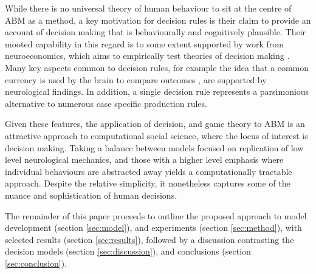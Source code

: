 While there is no universal theory of human behaviour to sit at the centre of \ac{ABM} as a method, a key motivation for decision rules is their claim to provide an account of decision making that is behaviourally and cognitively plausible. Their mooted capability in this regard is to some extent supported by work from neuroeconomics, which aims to empirically test theories of decision making \citep{Rustichini2009}. Many key aspects common to decision rules, for example the idea that a common currency is used by the brain to compare outcomes \citep{Padoa-Schioppa2006,Padoa-Schioppa2008}, are supported by neurological findings. In addition, a single decision rule represents a parsimonious alternative to numerous case specific production rules. 

Given these features, the application of decision, and game theory to \ac{ABM} is an attractive approach to computational social science, where the locus of interest is decision making. Taking a balance between models focused on replication of low level neurological mechanics, and those with a higher level emphasis where individual behaviours are abstracted away yields a computationally tractable approach. Despite the relative simplicity, it nonetheless captures some of the nuance and sophistication of human decisions.


The remainder of this paper proceeds to outline the proposed approach to model development (section \ref{sec:model}), and experiments (section \ref{sec:method}), with selected results (section \ref{sec:results}), followed by a discussion contrasting the decision models (section \ref{sec:discussion}), and conclusions (section \ref{sec:conclusion}).